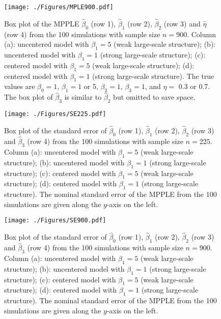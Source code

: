 \documentclass[authoryear,review, 12pt]{elsarticle}
\begin{document}
\begin{figure}[!htbp]
\begin{center} 
\texttt{[image: ./Figures/MPLE900.pdf]}
\end{center}
\caption{Box plot of the MPPLE $\widehat{\beta}_0$ (row 1), $\widehat{\beta}_1$ (row 2), $\widehat{\beta}_2$ (row 3) and $\widehat{\eta}$ (row 4) from the 100 simulations with sample size $n=900$. Column (a): uncentered model with $\beta_1=5$ (weak large-scale structure); (b): uncentered model with $\beta_1=1$ (strong large-scale structure); (c): centered model with $\beta_1=5$ (weak large-scale structure); (d): centered model with $\beta_1=1$ (strong large-scale structure). The true values are $\beta_0=1$, $\beta_1=1$ or 5, $\beta_2=1$, $\beta_3=1$, and $\eta=$ 0.3 or 0.7. The box plot of $\widehat{\beta}_3$ is similar to $\widehat{\beta}_2$ but omitted to save space.}
\label{fig:mple900}
\end{figure}

\begin{figure}[!htbp]
\begin{center}
\texttt{[image: ./Figures/SE225.pdf]}
\end{center}
\caption{Box plot of the standard error of $\widehat{\beta}_0$ (row 1), $\widehat{\beta}_1$ (row 2), $\widehat{\beta}_2$ (row 3) and $\widehat{\beta}_3$ (row 4) from the 100 simulations with sample size $n=225$.  Column (a): uncentered model with $\beta_1=5$ (weak large-scale structure); (b): uncentered model with $\beta_1=1$ (strong large-scale structure); (c): centered model with $\beta_1=5$ (weak large-scale structure); (d): centered model with $\beta_1=1$ (strong large-scale structure). The nominal standard error of the MPPLE from the 100 simulations are given along the $y$-axis on the left.}
\label{fig:se225}
\end{figure}

\begin{figure}[!htbp]
\begin{center}
\texttt{[image: ./Figures/SE900.pdf]}
\end{center}
\caption{Box plot of the standard error of $\widehat{\beta}_0$ (row 1), $\widehat{\beta}_1$ (row 2), $\widehat{\beta}_2$ (row 3) and $\widehat{\beta}_3$ (row 4) from the 100 simulations with sample size $n=900$. Column (a): uncentered model with $\beta_1=5$ (weak large-scale structure); (b): uncentered model with $\beta_1=1$ (strong large-scale structure); (c): centered model with $\beta_1=5$ (weak large-scale structure); (d): centered model with $\beta_1=1$ (strong large-scale structure). The nominal standard error of the MPPLE from the 100 simulations are given along the $y$-axis on the left.}
\label{fig:se900}
\end{figure}
\end{document}
